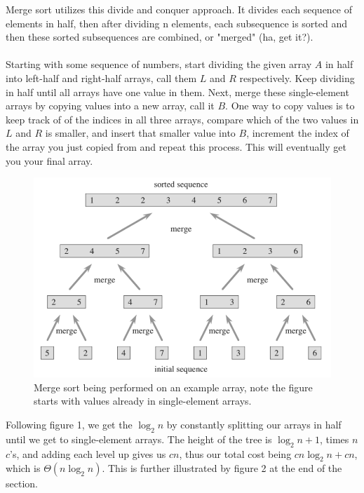 \documentclass[12pt]{article}
\begin{document}
Merge sort utilizes this divide and conquer approach. It divides each sequence of elements in half, then after dividing n elements, each subsequence is sorted and then these sorted subsequences are combined, or "merged" (ha, get it?).
\\
\\
Starting with some sequence of numbers, start dividing the given array $A$ in half into left-half and right-half arrays, call them $L$ and $R$ respectively. Keep dividing in half until all arrays have one value in them. Next, merge these single-element arrays by copying values into a new array, call it $B$. One way to copy values is to keep track of of the indices in all three arrays, compare which of the two values in $L$ and $R$ is smaller, and insert that smaller value into $B$, increment the index of the array you just copied from and repeat this process. This will eventually get you your final array.
\newpage
\begin{figure}[ht]
\centering
\includegraphics[scale=0.5]{merge}
\caption{
Merge sort being performed on an example array, note the figure starts with values already in single-element arrays.
}
\label{fig:merge_sort}
\end{figure}

Following figure 1, we get the $\log_2{n}$ by constantly splitting our arrays in half until we get to single-element arrays. The height of the tree is $\log_2{n} + 1$, times $n$ $c$'s, and adding each level up gives us $cn$, thus our total cost being $cn \log_2{n} + cn$, which is $\Theta{(n \log_2 n)}$. This is further illustrated by figure 2 at the end of the section.

\newpage
\end{document}
